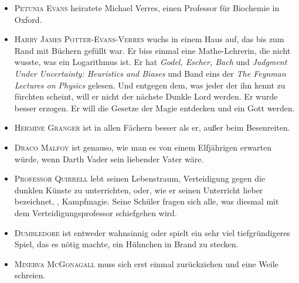 \begin{itemize}
\item \textsc{Petunia Evans} heiratete Michael Verres, einen Professor für Biochemie in Oxford.
\item \textsc{Harry James Potter-Evans-Verres} wuchs in einem Haus auf, das bis zum Rand mit Büchern gefüllt war. Er biss einmal eine Mathe-Lehrerin, die nicht wusste, was ein Logarithmus ist. Er hat \emph{Godel, Escher, Bach} und \emph{Judgment Under Uncertainty: Heuristics and Biases} und Band eins der \emph{The Feynman Lectures on Physics} gelesen. Und entgegen dem, was jeder der ihn kennt zu fürchten scheint, will er nicht der nächste Dunkle Lord werden. Er wurde besser erzogen. Er will die Gesetze der Magie entdecken und ein Gott werden.
\item \textsc{Hermine Granger} ist in allen Fächern besser als er, außer beim Besenreiten.
\item \textsc{Draco Malfoy} ist genauso, wie man es von einem Elfjährigen erwarten würde, wenn Darth Vader sein liebender Vater wäre.
\item \textsc{Professor Quirrell} lebt seinen Lebenstraum, Verteidigung gegen die dunklen Künste zu unterrichten, oder, wie er seinen Unterricht lieber bezeichnet, , Kampfmagie. Seine Schüler fragen sich alle, was diesmal mit dem Verteidigungsprofessor schiefgehen wird.
\item \textsc{Dumbledore} ist entweder wahnsinnig oder spielt ein sehr viel tiefgründigeres Spiel, das es nötig machte, ein Hühnchen in Brand zu stecken.
\item \textsc{Minerva McGonagall} muss sich erst einmal zurückziehen und eine Weile schreien.
\end{itemize}

